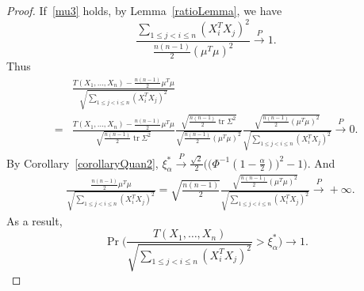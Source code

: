 \documentclass[review]{elsarticle}
\DeclareMathOperator{\mytr}{tr}
\theoremstyle{plain}
\theoremstyle{definition}
\theoremstyle{remark}
\begin{document}
\begin{proof}
    If~\eqref{mu3} holds, by Lemma~\ref{ratioLemma}, we have
    \begin{equation*}
    \frac{\sum_{1\leq j< i\leq n}(X_i^T X_j)^2}{\frac{n(n-1)}{2}{(\mu^T\mu)}^2}\xrightarrow{P}1.
    \end{equation*}
    Thus
    \begin{equation*}
        \begin{aligned}
            &\frac{T( X_1,\ldots, X_n)-\frac{n(n-1)}{2}\mu^T\mu}{\sqrt{\sum_{1\leq j<i\leq n}{(X_i^T X_j)}^2}}        \\
            =&\frac{T( X_1,\ldots, X_n)-\frac{n(n-1)}{2}\mu^T\mu}{\sqrt{\frac{n(n-1)}{2}\mytr \Sigma^2}}
            \frac{\sqrt{\frac{n(n-1)}{2}\mytr \Sigma^2}}{\sqrt{\frac{n(n-1)}{2}{(\mu^T \mu)}^2}}        
            \frac{\sqrt{\frac{n(n-1)}{2}{(\mu^T \mu)}^2}}{\sqrt{\sum_{1\leq j<i\leq n}{(X_i^T X_j)}^2}}        
            \xrightarrow{P} 0.
        \end{aligned}
    \end{equation*}
    By Corollary~\ref{corollaryQuan2}, $\xi_{\alpha}^*\xrightarrow{P}\frac{\sqrt{2}}{2}\Big(\big(\Phi^{-1}(1-\frac{\alpha}{2})\big)^2-1\Big)$. And 
    \begin{equation*}
        \begin{aligned}
            &\frac{\frac{n(n-1)}{2}\mu^T\mu}{\sqrt{\sum_{1\leq j<i\leq n}{(X_i^T X_j)}^2}}
            =
    \sqrt{\frac{n(n-1)}{2}}\frac{\sqrt{\frac{n(n-1)}{2}(\mu^T\mu)^2}}{\sqrt{\sum_{1\leq j<i\leq n}{(X_i^T X_j)}^2}}
    \xrightarrow{P}+\infty.
        \end{aligned}
    \end{equation*}
    As a result,
    \begin{equation*}
        \Pr\Big(\frac{T( X_1,\ldots, X_n)}{\sqrt{\sum_{1\leq j<i\leq n}{(X_i^T X_j)}^2}}>\xi_{\alpha}^* \Big)
    \to 1.
    \end{equation*}


\end{proof}
\end{document}

